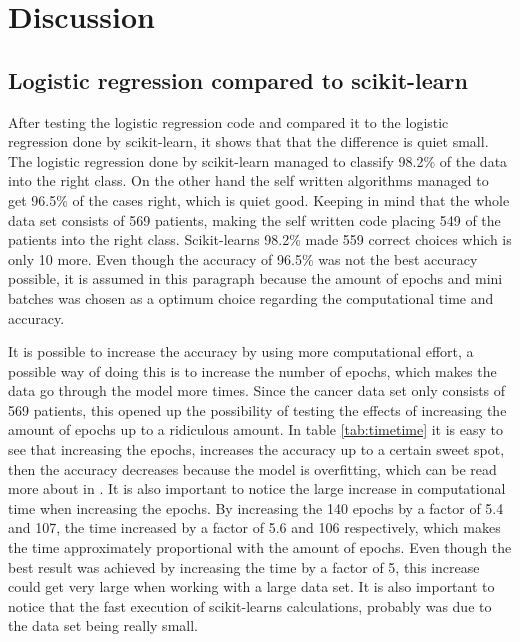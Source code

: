 \documentclass[../main.tex]{subfiles}
\begin{document}
\section{Discussion}
\subsection{Logistic regression compared to scikit-learn}
After testing the logistic regression code and compared it to the logistic regression done by scikit-learn, it shows that that the difference is quiet small. The logistic regression done by scikit-learn managed to classify 98.2\% of the data into the right class. On the other hand the self written algorithms managed to get 96.5\% of the cases right, which is quiet good. Keeping in mind that the whole data set consists of 569 patients, making the self written code placing 549 of the patients into the right class. Scikit-learns 98.2\% made 559 correct choices which is only 10 more. Even though the accuracy of 96.5\% was not the best accuracy possible, it is assumed in this paragraph because the amount of epochs and mini batches was chosen as a optimum choice regarding the computational time and accuracy. 

It is possible to increase the accuracy by using more computational effort, a possible way of doing this is to increase the number of epochs, which makes the data go through the model more times. Since the cancer data set only consists of 569 patients, this opened up the possibility of testing the effects of increasing the amount of epochs up to a ridiculous amount. In table \ref{tab:timetime} it is easy to see that increasing the epochs, increases the accuracy up to a certain sweet spot, then the accuracy decreases because the model is overfitting, which can be read more about in \cite{project1}. It is also important to notice the large increase in computational time when increasing the epochs. By increasing the 140 epochs by a factor of 5.4 and 107, the time increased by a factor of 5.6 and 106 respectively, which makes the time approximately proportional with the amount of epochs. Even though the best result was achieved by increasing the time by a factor of 5, this increase could get very large when working with a large data set. It is also important to notice that the fast execution of scikit-learns calculations, probably was due to the data set being really small.
\end{document}
